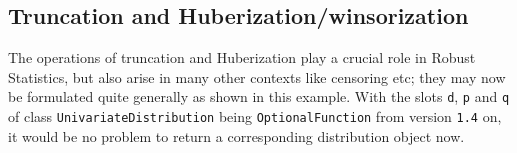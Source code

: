 \documentclass[11pt]{article}
\begin{document}
\subsection{Truncation and Huberization/winsorization}\label{truncex}
\begin{small}
The operations of truncation and Huberization play a crucial role in Robust Statistics, but also
arise in many other contexts like censoring etc; they may now be formulated quite generally as shown
in this example. With the slots {\tt d}, {\tt p} and {\tt q} of class {\tt UnivariateDistribution} being
{\tt OptionalFunction} from version {\tt 1.4} on, it would be no problem to return a corresponding
distribution object now.
\end{small}
\end{document}
